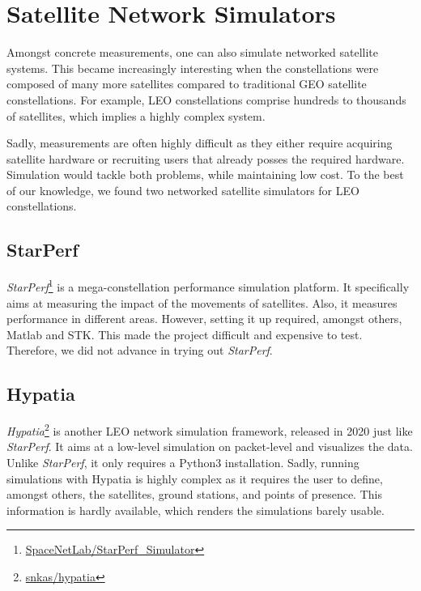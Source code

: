 \section{Satellite Network Simulators} \label{sec:satellite_network_simulators}

Amongst concrete measurements, one can also simulate networked satellite systems. This
became increasingly interesting when the constellations were composed of many more
satellites compared to traditional \ac{GEO} satellite constellations. For example,
\ac{LEO} constellations comprise hundreds to thousands of satellites, which implies
a highly complex system.

Sadly, measurements are often highly difficult as they either require acquiring satellite
hardware or recruiting users that already posses the required hardware. Simulation would
tackle both problems, while maintaining low cost. To the best of our knowledge, we found
two networked satellite simulators for \ac{LEO} constellations.

\subsection{StarPerf} \label{sec:starperf}

\textit{StarPerf}\footnote{\href{https://github.com/SpaceNetLab/StarPerf\_Simulator}{SpaceNetLab/StarPerf\_Simulator}} \cite{DBLP:conf/icnp/LaiLL20} is a mega-constellation performance simulation platform.
It specifically aims at measuring the impact of the movements of satellites.
Also, it measures performance in different areas. However, setting it up required, amongst others, Matlab and STK. This made the project difficult and expensive to test. Therefore, we did not advance in trying out \textit{StarPerf}.

\subsection{Hypatia} \label{sec:hypatia}

\textit{Hypatia}\footnote{\href{https://github.com/snkas/hypatia}{snkas/hypatia}} \cite{DBLP:conf/imc/KassingBASS20} is another LEO network simulation framework, released in 2020 just like \textit{StarPerf}.
It aims at a low-level simulation on packet-level and visualizes the data. Unlike \textit{StarPerf}, it only requires a Python3 installation. Sadly, running simulations with Hypatia is highly complex as it requires the user to define, amongst others, the satellites, ground stations, and points of presence. This information is hardly available, which renders the simulations barely usable.

